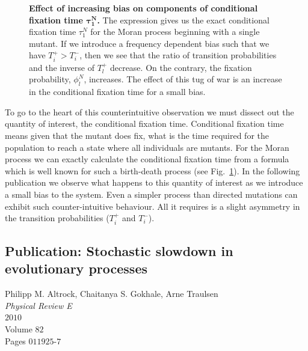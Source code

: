 \documentclass[oneside,11pt,a4paper]{book}
\begin{document}
%
\begin{figure}[!h]
  \begin{center}
    \caption{\textbf{Effect of increasing bias on components of conditional fixation time $\mathbf{\tau_1^{N}}$.}
    \small{The expression gives us the exact conditional fixation time $\tau_1^{N}$ for the Moran process beginning with a single mutant.
    If we introduce a frequency dependent bias such that we have $T_i^+ > T_i^-$, then we see that the ratio of transition probabilities and the inverse of $T_l^+$ decrease.
    On the contrary, the fixation probability, $\phi_l^N$, increases.
    The effect of this tug of war is an increase in the conditional fixation time for a small bias.}
 }
    \label{fig:stosloeffect}
  \end{center}
\end{figure}
%

To go to the heart of this counterintuitive observation we must dissect out the quantity of interest, the conditional fixation time.
Conditional fixation time means given that the mutant does fix, what is the time required for the population to reach a state where all individuals are mutants.
For the Moran process we can exactly calculate the conditional fixation time from a formula which is well known for such a birth-death process \citep{moran:1962ef,goel:1974aa,ewens:1979qe,landauer:1987pr,antal:2006aa,traulsen:2009bb} (see Fig.\ \ref{fig:stosloeffect}).
In the following publication we observe what happens to this quantity of interest as we introduce a small bias to the system.
Even a simpler process than directed mutations can exhibit such counter-intuitive behaviour.
All it requires is a slight asymmetry in the transition probabilities ($T_i^+$ and $T_i^-$).

\newpage
\subsection{Publication: Stochastic slowdown in evolutionary processes}

Philipp M. Altrock, Chaitanya S. Gokhale, Arne Traulsen\\
\textit{Physical Review E}\\
$2010$\\
Volume $82$\\
Pages $011925$-$7$

\end{document}
